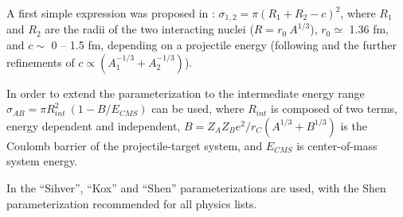 A first simple expression was proposed in \cite{hadbib:AAx5}:
$\sigma_{1,2}=\pi (R_1+R_2-c)^2$, where $R_1$ and $R_2$ are the radii of
the two interacting nuclei ($R=r_0\ A^{1/3}$), $r_0\simeq$ 1.36 fm, and 
$c\sim$ 0 -- 1.5 fm, depending on a projectile energy (following  
\cite{hadbib:AAx6} and the further refinements of \cite{hadbib:AAx7}
 $c \propto (A_1^{-1/3}+A_2^{-1/3})$).

In order to extend the parameterization to the intermediate energy range
\cite{hadbib:AAx8} $\sigma_{AB} = \pi R_{int}^2\ (1-B/E_{CMS})$ can be used,
where $R_{int}$ is composed of two terms, energy dependent and independent, 
$B = Z_A Z_B e^2/r_C(A^{1/3}+B^{1/3})$ is the Coulomb barrier of the 
projectile-target system, and $E_{CMS}$ is center-of-mass system energy.

In \Gfour{} the ``Sihver'', ``Kox'' and ``Shen'' parameterizations 
\cite{hadbib:AAx7,hadbib:AAx8,hadbib:AAx9} are used, with the Shen 
parameterization recommended for all physics lists.

